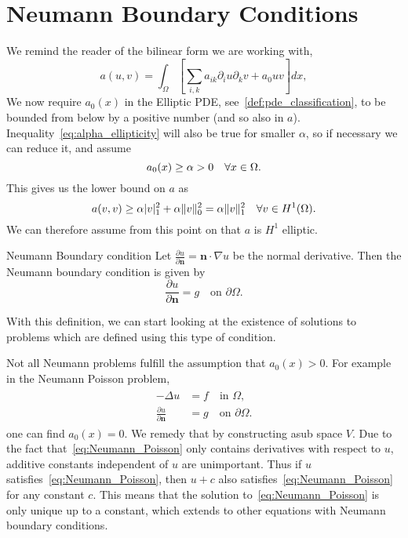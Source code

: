 \section{Neumann Boundary Conditions}
We remind the reader of the bilinear form we are working with,
\begin{equation}
   a(u,v) = \int_\Omega \left[\sum_{i,k} a_{ik}\partial_i u\partial_k v+a_0uv\right]dx,
\end{equation}
We now require $a_0(x)$ in the Elliptic PDE, see~\ref{def:pde_classification}, to be bounded from below by a positive number (and so also in $a$). 
Inequality~\eqref{eq:alpha_ellipticity} will also be true for smaller $\alpha$, so if 
necessary we can reduce it, and assume 
\begin{equation*}
  a_0(x) \geq \alpha >0 \quad \forall x \in \Omega.
\end{equation*}
This gives us the lower bound on $a$ as 
\begin{equation*}
   a(v,v)  \geq \alpha |v|^2_1 + \alpha \|v\|^2_0 = \alpha \|v\|^2_1 \quad \forall v \in H^1(\Omega).
\end{equation*}
We can therefore assume from this point on that $a$ is $H^1$ elliptic.

\begin{defn}{Neumann Boundary condition}
    Let $\frac{\partial u}{\partial \mathbf{n}}= \mathbf{n}\cdot \nabla u$ be the normal derivative. Then the Neumann boundary condition is given by
    \begin{equation}
        \frac{\partial u}{\partial \mathbf{n}}  = g\quad \text{on } \partial \Omega.
    \end{equation}
\end{defn}
With this definition, we can start looking at the existence of solutions to problems which are defined using this type of condition.

Not all Neumann problems fulfill the assumption that $a_0(x)>0$. For example in the 
Neumann Poisson problem,  
\begin{align}
\label{eq:Neumann_Poisson}
\begin{split}
    -\Delta u &= f \quad \text{in } \Omega, \\
    \frac{\partial u}{\partial \mathbf{n}} &= g \quad \text{on } \partial \Omega.
\end{split}
\end{align}
one can find $a_0(x)=0$. We remedy that by constructing asub space $V$.
Due to the fact that~\eqref{eq:Neumann_Poisson} only contains derivatives with respect to $u$,
 additive constants independent of $u$ are unimportant.
Thus if $u$ satisfies~\eqref{eq:Neumann_Poisson}, then $u + c$ also satisfies~\eqref{eq:Neumann_Poisson} for any constant $c$.
This means that the solution to~\eqref{eq:Neumann_Poisson} is only unique up to a constant,
 which extends to other equations with Neumann boundary conditions.

